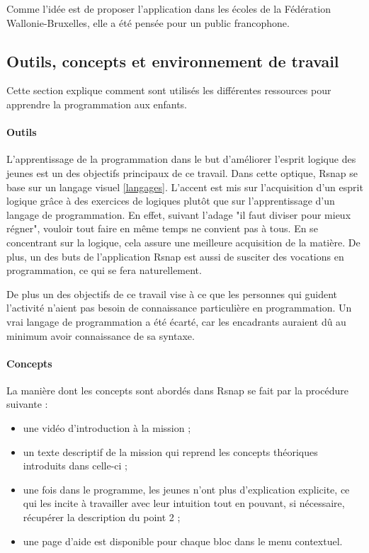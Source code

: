 Comme l'idée est de proposer l'application dans les écoles de la Fédération Wallonie-Bruxelles, elle a été pensée pour un public francophone.

\subsection{Outils, concepts et environnement de travail}
Cette section explique comment sont utilisés les différentes ressources pour apprendre la programmation aux enfants.

\paragraph{Outils}
\label{outil}
L'apprentissage de la programmation dans le but d'améliorer l'esprit logique des jeunes est un des objectifs principaux de ce travail. Dans cette optique, \gls{Rsnap} se base sur un langage visuel \ref{langages}. L'accent est mis sur l'acquisition d'un esprit logique grâce à des exercices de logiques plutôt que sur l'apprentissage d'un langage de programmation.  En effet, suivant l'adage "il faut diviser pour mieux régner", vouloir tout faire en même temps ne convient pas à tous. En se concentrant sur la logique, cela assure une meilleure acquisition de la matière. De plus, un des buts de l'application \gls{Rsnap} est aussi de susciter des vocations en programmation, ce qui se fera naturellement.

De plus un des objectifs de ce travail vise à ce que les personnes qui guident l'activité n'aient pas besoin de connaissance particulière en programmation. Un vrai langage de programmation a été écarté, car les encadrants auraient dû au minimum avoir connaissance de sa syntaxe.

\paragraph{Concepts}
La manière dont les concepts sont abordés dans \gls{Rsnap} se fait par la procédure suivante :
\begin{itemize}
	\item une vidéo d'introduction à la mission ;
	\item un texte descriptif de la mission qui reprend les concepts théoriques introduits dans celle-ci ;
	\item une fois dans le programme, les jeunes n'ont plus d'explication explicite, ce qui les incite à travailler avec leur intuition tout en pouvant, si nécessaire, récupérer la description du point 2 ;
	\item une page d'aide est disponible pour chaque \gls{bloc} dans le menu contextuel.
\end{itemize}

